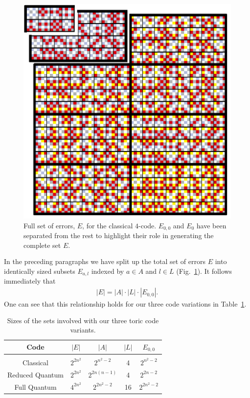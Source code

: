 \begin{figure}[htb]
  \begin{center}
    \includegraphics{figures/4_array.pdf}
  \end{center}
  \caption{Full set of errors, $E$, for the classical $4$-code. $E_{0,0}$ and $E_0$ have been separated from the rest to highlight their role in generating the complete set $E$.}
  \label{4_array}
\end{figure}

In the preceding paragraphs we have split up the total set of errors $E$ into identically sized subsets $E_{a, l}$ indexed by $a\in A$ and $l\in L$ (Fig.~\ref{4_array}). It follows immediately that
\begin{align}
  |E| = |A| \cdot |L| \cdot |E_{0,0}|.
\end{align}
One can see that this relationship holds for our three code variations in Table~\ref{code_sizes}.

\begin{table}
  \begin{center}
    \begin{tabular}{c c c c c}
      Code & $|E|$ & $|A|$ & $|L|$ & $E_{0,0}$ \\[1.5ex]
      \hline \\[0ex]
      Classical         & $2^{2n^2}$ & $2^{n^2-2}$ &  4 & $2^{n^2-2}$ \\[3ex]
      Reduced Quantum   & $2^{2n^2}$ & $2^{2n(n-1)}$ &  4 & $2^{2n-2}$ \\[3ex] 
      Full Quantum      & $4^{2n^2}$ & $2^{2n^2-2}$ & 16 & $2^{2n^2-2}$
    \end{tabular}
  \end{center}
  \caption{Sizes of the sets involved with our three toric code variants.}
  \label{code_sizes}
\end{table}

